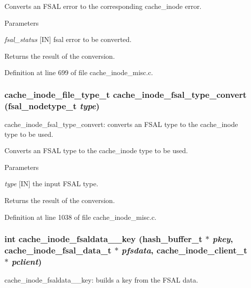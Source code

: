 Converts an FSAL error to the corresponding cache\_\-inode error.


\begin{DoxyParams}{Parameters}
\item[{\em fsal\_\-status}][IN] fsal error to be converted.\end{DoxyParams}
\begin{DoxyReturn}{Returns}
the result of the conversion. 
\end{DoxyReturn}


Definition at line 699 of file cache\_\-inode\_\-misc.c.
\subsubsection[{cache\_\-inode\_\-fsal\_\-type\_\-convert}]{\setlength{\rightskip}{0pt plus 5cm}cache\_\-inode\_\-file\_\-type\_\-t cache\_\-inode\_\-fsal\_\-type\_\-convert (fsal\_\-nodetype\_\-t {\em type})}\label{cache__inode__misc_8c_a8f6934bbf38300379caf1342b6a63b26}
cache\_\-inode\_\-fsal\_\-type\_\-convert: converts an FSAL type to the cache\_\-inode type to be used.

Converts an FSAL type to the cache\_\-inode type to be used.


\begin{DoxyParams}{Parameters}
\item[{\em type}][IN] the input FSAL type.\end{DoxyParams}
\begin{DoxyReturn}{Returns}
the result of the conversion. 
\end{DoxyReturn}


Definition at line 1038 of file cache\_\-inode\_\-misc.c.
\subsubsection[{cache\_\-inode\_\-fsaldata\_\-2\_\-key}]{\setlength{\rightskip}{0pt plus 5cm}int cache\_\-inode\_\-fsaldata\_\_\-key (hash\_\-buffer\_\-t $\ast$ {\em pkey}, \/  cache\_\-inode\_\-fsal\_\-data\_\-t $\ast$ {\em pfsdata}, \/  cache\_\-inode\_\-client\_\-t $\ast$ {\em pclient})}\label{cache__inode__misc_8c_a7bf5883d643f1a7940f2290a6d2d9686}
cache\_\-inode\_\-fsaldata\_\_\-key: builds a key from the FSAL data.

